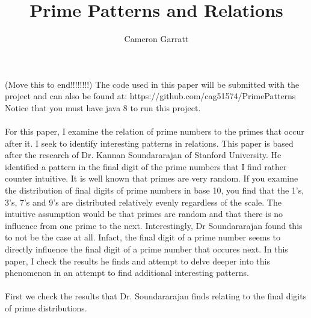 \documentclass[13pt]{article}
\title{Prime Patterns and Relations}
\author{Cameron Garratt}
\begin{document}
\maketitle
\large
(Move this to end!!!!!!!!) The code used in this paper will be submitted with the project and can also be found at: https://github.com/cag51574/PrimePatterns\\ Notice that you must have java 8 to run this project.\\\\
For this paper, I examine the relation of prime numbers to the primes that occur after it. 
I seek to identify interesting patterns in relations. 
This paper is based after the research of Dr. 
Kannan Soundararajan of Stanford University. 
He identified a pattern in the final digit of the prime numbers that I find rather counter intuitive. 
It is well known that primes are very random. 
If you examine the distribution of final digits of prime numbers in base 10, you find that the 1's, 3's, 7's and 9's are distributed relatively evenly regardless of the scale. 
The intuitive assumption would be that primes are random and that there is no influence from one prime to the next. 
Interestingly, Dr Soundararajan found this to not be the case at all. 
Infact, the final digit of a prime number seems to directly influence the final digit of a prime number that occures next.
In this paper, I check the results he finds and attempt to delve deeper into this phenomenon in an attempt to find additional interesting patterns.\\\\
\indent
First we check the results that Dr. Soundararajan finds relating to the final digits of prime distributions. 



 
\end{document}
